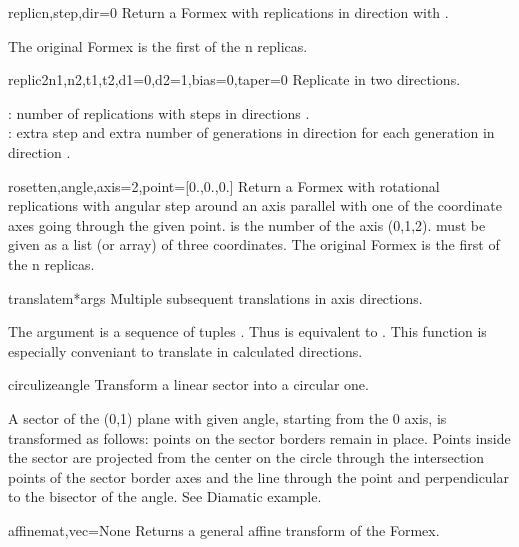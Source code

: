 {{\begin{methoddesc}  {replic}{n,step,dir=0}
Return a Formex with  replications in direction  with .

The original Formex is the first of the n replicas.
\end{methoddesc}

\begin{methoddesc}  {replic2}{n1,n2,t1,t2,d1=0,d2=1,bias=0,taper=0}
Replicate in two directions.

 : number of replications with steps  in directions .\\
 : extra step and extra number of generations in direction  for each generation in direction .
\end{methoddesc}

\begin{methoddesc}  {rosette}{n,angle,axis=2,point=[0.,0.,0.]}
Return a Formex with  rotational replications with angular step  around an axis parallel with one of the coordinate axes going through the given point.  is the number of the axis (0,1,2).  must be given as a list (or array) of three coordinates. The original Formex is the first of the n replicas.
\end{methoddesc}

\begin{methoddesc}  {translatem}{*args}
Multiple subsequent translations in axis directions.

The argument  is a sequence of tuples . Thus  is equivalent to . This function is especially conveniant to translate in calculated directions.
\end{methoddesc}

\begin{methoddesc}  {circulize}{angle}
Transform a linear sector into a circular one.

A sector of the (0,1) plane with given angle, starting from the 0 axis, is transformed as follows: points on the sector borders remain in place. Points inside the sector are projected from the center on the circle through the intersection points of the sector border axes and the line through the point and perpendicular to the bisector of the angle. See Diamatic example.
\end{methoddesc}

\begin{methoddesc}  {affine}{mat,vec=None}
Returns a general affine transform of the Formex.


\end{methoddesc}}}

